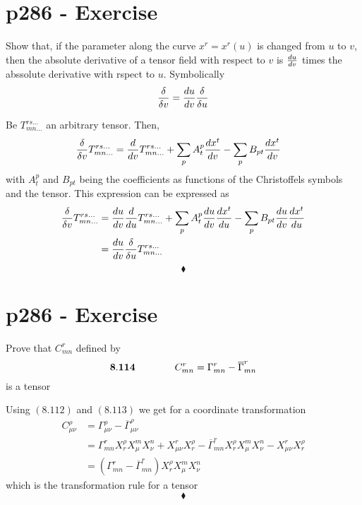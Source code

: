 \section{p286 - Exercise}
\begin{tcolorbox}
Show that, if the parameter along the curve $x^r=x^r(u)$ is changed from $u$ to $v$, then the absolute derivative of a tensor field with respect to $v$ is $\dv{u}{v}$ times the abssolute derivative with rspect to $u$. Symbolically
$$\fdv{}{v}= \dv{u}{v}\fdv{}{u}$$
\end{tcolorbox}
Be $T^{rs\dots}_{mn\dots}$ an arbitrary tensor. Then,
\begin{align*}
\fdv{}{v}T^{rs\dots}_{mn\dots} &= \dv{}{v}T^{rs\dots}_{mn\dots}+ \sum_{p} A^p_t \dv{x^t}{v} - \sum_{p} B_{pt} \dv{x^t}{v} 
\end{align*}
with $A^p_t$ and $B_{pt}$ being the coefficients as functions of the Christoffels symbols and the tensor.
This expression can be expressed as 
\begin{align*}
\fdv{}{v}T^{rs\dots}_{mn\dots} &= \dv{u}{v}\dv{}{u}T^{rs\dots}_{mn\dots}+ \sum_{p} A^p_t  \dv{u}{v}\dv{x^t}{u} - \sum_{p} B_{pt}  \dv{u}{v}\dv{x^t}{u} \\
&=\dv{u}{v}\fdv{}{u}T^{rs\dots}_{mn\dots}
\end{align*}
$$\blacklozenge$$
\newpage

\section{p286 - Exercise}
\begin{tcolorbox}
Prove that $C^r_{mn}$ defined by 
$$\mathbf{8.114}\quad\quad\quad\quad C^r_{mn}=\Gamma^r_{mn}-\overline{\Gamma}^r_{mn}$$
is a tensor 
\end{tcolorbox}
Using $\mathbf{(8.112)}$ and $\mathbf{(8.113)}$ we get for a coordinate transformation
\begin{align*}
C^{\rho}_{\mu \nu }&=\Gamma^{\rho}_{\mu \nu }-\overline{\Gamma}^{\rho}_{\mu \nu }\\
&= \Gamma^{r}_{mn}X^{\rho}_{r}X^{m}_{\mu}X^{n}_{\nu}+ X^{r}_{\mu \nu}X^{\rho}_{r}-\overline{\Gamma}^{r}_{mn}X^{\rho}_{r}X^{m}_{\mu}X^{n}_{\nu}- X^{r}_{\mu \nu}X^{\rho}_{r}\\
&= \left(\Gamma^{r}_{mn}- \overline{\Gamma}^{r}_{mn}\right) X^{\rho}_{r}X^{m}_{\mu}X^{n}_{\nu}
\end{align*}
which is the transformation rule for a tensor 
$$\blacklozenge$$
\newpage



